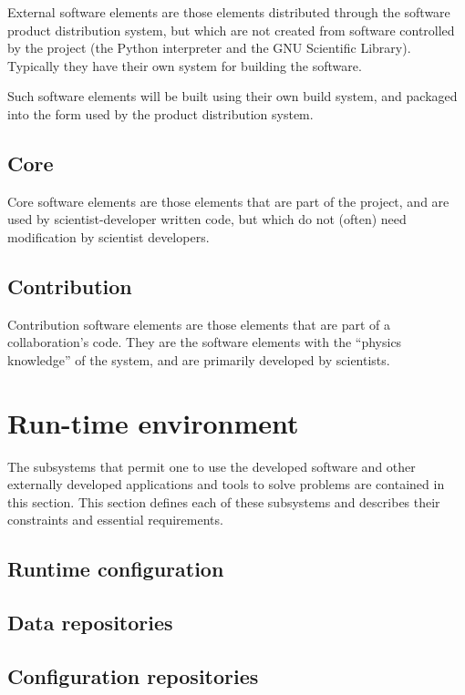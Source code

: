 \documentclass[draftmode,draftwater]{memarticle}
\begin{document}
External software elements are those elements distributed through the
software product distribution system, but which are not created from
software controlled by the project (\eg the Python interpreter and the
GNU Scientific Library). Typically they have their own system for
building the software.

Such software elements will be built using their own build system, and
packaged into the form used by the product distribution system.

\subsection{Core}

Core software elements are those elements that are part of the project,
and are used by scientist-developer written code, but which do not
(often) need modification by scientist developers.

\subsection{Contribution}

Contribution software elements are those elements that are part of a
collaboration's code. They are the software elements with the ``physics
knowledge'' of the system, and are primarily developed by scientists.

\section{Run-time environment}

The subsystems that permit one to use the developed software and other
externally developed applications and tools to solve problems are
contained in this section. This section defines each of these subsystems
and describes their constraints and essential requirements.

\subsection{Runtime configuration}

\subsection{Data repositories}

\subsection{Configuration repositories}
\end{document}
